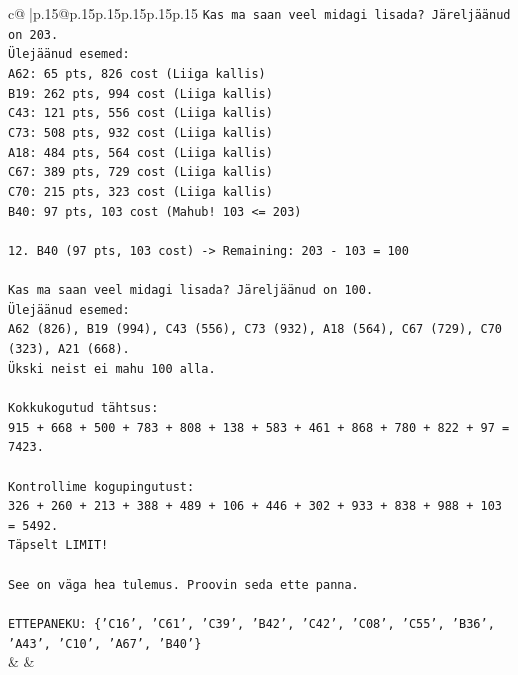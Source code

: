 \documentclass{article}
\begin{document}
{\begin{supertabular}{c@{$\;$}|p{.15\linewidth}@{}p{.15\linewidth}p{.15\linewidth}p{.15\linewidth}p{.15\linewidth}p{.15\linewidth}}
{{{\texttt{Kas ma saan veel midagi lisada? Järeljäänud on 203.} \\
\texttt{Ülejäänud esemed:} \\
\texttt{A62: 65 pts, 826 cost (Liiga kallis)} \\
\texttt{B19: 262 pts, 994 cost (Liiga kallis)} \\
\texttt{C43: 121 pts, 556 cost (Liiga kallis)} \\
\texttt{C73: 508 pts, 932 cost (Liiga kallis)} \\
\texttt{A18: 484 pts, 564 cost (Liiga kallis)} \\
\texttt{C67: 389 pts, 729 cost (Liiga kallis)} \\
\texttt{C70: 215 pts, 323 cost (Liiga kallis)} \\
\texttt{B40: 97 pts, 103 cost (Mahub! 103 <= 203)} \\
\\ 
\texttt{12. B40 (97 pts, 103 cost) {-}> Remaining: 203 {-} 103 = 100} \\
\\ 
\texttt{Kas ma saan veel midagi lisada? Järeljäänud on 100.} \\
\texttt{Ülejäänud esemed:} \\
\texttt{A62 (826), B19 (994), C43 (556), C73 (932), A18 (564), C67 (729), C70 (323), A21 (668).} \\
\texttt{Ükski neist ei mahu 100 alla.} \\
\\ 
\texttt{Kokkukogutud tähtsus:} \\
\texttt{915 + 668 + 500 + 783 + 808 + 138 + 583 + 461 + 868 + 780 + 822 + 97 = 7423.} \\
\\ 
\texttt{Kontrollime kogupingutust:} \\
\texttt{326 + 260 + 213 + 388 + 489 + 106 + 446 + 302 + 933 + 838 + 988 + 103 = 5492.} \\
\texttt{Täpselt LIMIT!} \\
\\ 
\texttt{See on väga hea tulemus. Proovin seda ette panna.} \\
\\ 
\texttt{ETTEPANEKU: \{'C16', 'C61', 'C39', 'B42', 'C42', 'C08', 'C55', 'B36', 'A43', 'C10', 'A67', 'B40'\}} \\
            }
        }
    }
    & & \\ \\


\end{supertabular}}
\end{document}
